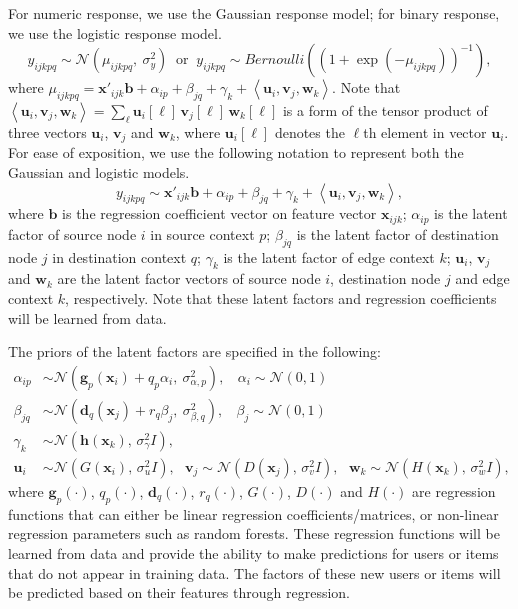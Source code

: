 \documentclass[10pt]{article}
\newcommand{\parahead}[1]{\vspace{0.15in}\noindent{\bf #1:}}
\begin{document}
\parahead{Response model}
For numeric response, we use the Gaussian response model; for binary response, we use the logistic response model.
\begin{equation*}
y_{ijkpq} \sim \mathcal{N}(\mu_{ijkpq},~ \sigma^2_{y}) ~\textrm{ or }~
y_{ijkpq} \sim \textit{Bernoulli}((1 + \exp(-\mu_{ijkpq}))^{-1}),
\end{equation*}
where $\mu_{ijkpq} = \bm{x}'_{ijk} \bm{b} + \alpha_{ip} + \beta_{jq} + \gamma_{k} + \left<\bm{u}_i, \bm{v}_j, \bm{w}_k\right>$.  Note that $\left<\bm{u}_i, \bm{v}_j, \bm{w}_k\right> = \sum_{\ell} \bm{u}_i[\ell]\, \bm{v}_j[\ell]\, \bm{w}_k[\ell]$ is a form of the tensor product of three vectors $\bm{u}_i$, $\bm{v}_j$ and $\bm{w}_k$, where $\bm{u}_i[\ell]$ denotes the $\ell$th element in vector $\bm{u}_i$.
For ease of exposition, we use the following notation to represent both the Gaussian and logistic models.
\begin{equation}
y_{ijkpq} \sim \bm{x}'_{ijk} \bm{b} + \alpha_{ip} + \beta_{jq} + \gamma_{k} + \left<\bm{u}_i, \bm{v}_j, \bm{w}_k\right>, \label{eq:uvw-model}
\end{equation}
where $\bm{b}$ is the regression coefficient vector on feature vector $\bm{x}_{ijk}$; $\alpha_{ip}$ is the latent factor of source node $i$ in source context $p$; $\beta_{jq}$ is the latent factor of destination node $j$ in destination context $q$; $\gamma_{k}$ is the latent factor of edge context $k$; $\bm{u}_i$, $\bm{v}_j$ and $\bm{w}_k$ are the latent factor vectors of source node $i$, destination node $j$ and edge context $k$, respectively.  Note that these latent factors and regression coefficients will be learned from data.

\parahead{Regression Priors}
The priors of the latent factors are specified in the following:
\begin{align}
\alpha_{ip} & \sim \mathcal{N}(\bm{g}_{p}(\bm{x}_{i}) + q_{p} \alpha_i, ~\sigma_{\alpha,p}^2),
	~~~~ \alpha_i \sim \mathcal{N}(0, 1) \label{eq:alpha} \\
\beta_{jq} & \sim \mathcal{N}(\bm{d}_{q}(\bm{x}_{j}) + r_{q} \beta_j, ~\sigma_{\beta,q}^2),
	~~~~ \beta_j  \sim \mathcal{N}(0, 1) \label{eq:beta} \\
\gamma_{k} & \sim \mathcal{N}(\bm{h}(\bm{x}_k), \,\sigma_{\gamma}^2 I), \\
\bm{u}_{i} & \sim \mathcal{N}(G(\bm{x}_i), \,\sigma_{u}^2 I), ~~~
\bm{v}_{j} \sim \mathcal{N}(D(\bm{x}_j), \,\sigma_{v}^2 I), ~~~
\bm{w}_{k} \sim \mathcal{N}(H(\bm{x}_k), \,\sigma_{w}^2 I), \label{eq:uvw}
\end{align}
where $\bm{g}_p(\cdot)$, $q_p(\cdot)$, $\bm{d}_q(\cdot)$, $r_q(\cdot)$, $G(\cdot)$, $D(\cdot)$ and $H(\cdot)$ are regression functions that can either be linear regression coefficients/matrices, or non-linear regression parameters such as random forests. These regression functions will be learned from data and provide the ability to make predictions for users or items that do not appear in training data.  The factors of these new users or items will be predicted based on their features through regression.
\end{document}
